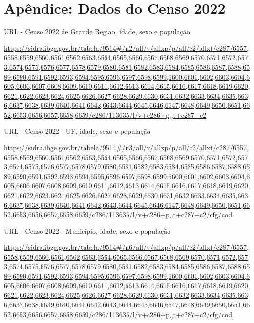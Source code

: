 \documentclass[12pt]{article}
\begin{document}
\section{Apêndice: Dados do Censo 2022}
URL - Censo 2022 de Grande Regiao, idade, sexo e população

\url{https://sidra.ibge.gov.br/tabela/9514#/n2/all/v/allxp/p/all/c2/allxt/c287/6557,6558,6559,6560,6561,6562,6563,6564,6565,6566,6567,6568,6569,6570,6571,6572,6573,6574,6575,6576,6577,6578,6579,6580,6581,6582,6583,6584,6585,6586,6587,6588,6589,6590,6591,6592,6593,6594,6595,6596,6597,6598,6599,6600,6601,6602,6603,6604,6605,6606,6607,6608,6609,6610,6611,6612,6613,6614,6615,6616,6617,6618,6619,6620,6621,6622,6623,6624,6625,6626,6627,6628,6629,6630,6631,6632,6633,6634,6635,6636,6637,6638,6639,6640,6641,6642,6643,6644,6645,6646,6647,6648,6649,6650,6651,6652,6653,6656,6657,6658,6659/c286/113635/l/v+c286+p,,t+c287+c2}

URL - Censo 2022 - UF, idade, sexo e população

\url{https://sidra.ibge.gov.br/tabela/9514#/n3/all/v/allxp/p/all/c2/allxt/c287/6557,6558,6559,6560,6561,6562,6563,6564,6565,6566,6567,6568,6569,6570,6571,6572,6573,6574,6575,6576,6577,6578,6579,6580,6581,6582,6583,6584,6585,6586,6587,6588,6589,6590,6591,6592,6593,6594,6595,6596,6597,6598,6599,6600,6601,6602,6603,6604,6605,6606,6607,6608,6609,6610,6611,6612,6613,6614,6615,6616,6617,6618,6619,6620,6621,6622,6623,6624,6625,6626,6627,6628,6629,6630,6631,6632,6633,6634,6635,6636,6637,6638,6639,6640,6641,6642,6643,6644,6645,6646,6647,6648,6649,6650,6651,6652,6653,6656,6657,6658,6659/c286/113635/l/v+c286+p,,t+c287+c2/cfg/cod,}

URL - Censo 2022 - Município, idade, sexo e população

\url{https://sidra.ibge.gov.br/tabela/9514#/n6/all/v/allxp/p/all/c2/allxt/c287/6557,6558,6559,6560,6561,6562,6563,6564,6565,6566,6567,6568,6569,6570,6571,6572,6573,6574,6575,6576,6577,6578,6579,6580,6581,6582,6583,6584,6585,6586,6587,6588,6589,6590,6591,6592,6593,6594,6595,6596,6597,6598,6599,6600,6601,6602,6603,6604,6605,6606,6607,6608,6609,6610,6611,6612,6613,6614,6615,6616,6617,6618,6619,6620,6621,6622,6623,6624,6625,6626,6627,6628,6629,6630,6631,6632,6633,6634,6635,6636,6637,6638,6639,6640,6641,6642,6643,6644,6645,6646,6647,6648,6649,6650,6651,6652,6653,6656,6657,6658,6659/c286/113635/l/v+c286+p,,t+c287+c2/cfg/cod,}
\end{document}
